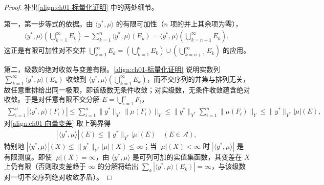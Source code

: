 \documentclass[../../main.tex]{subfiles}%
\begin{document}
\begin{proof}
补出\eqref{align:ch01-标量化证明} 中的两处细节。

第一，第一步等式的依据。由 $\langle y^*,\mu\rangle$ 的有限可加性（$n$ 项的并上其余项为零），
\begin{align*}
\langle y^*,\mu\rangle\left(\bigcup_{k=1}^\infty E_k\right)-\sum_{k=1}^n\langle y^*,\mu\rangle(E_k)
=\langle y^*,\mu\rangle\left(\bigcup_{k=n+1}^\infty E_k\right),
\end{align*}
这正是有限可加性对不交并 $\bigcup_{k=1}^\infty E_k=\left(\bigcup_{k=1}^n E_k\right)\cup\left(\bigcup_{k=n+1}^\infty E_k\right)$ 的应用。

第二，级数的绝对收敛与变差有限。\eqref{align:ch01-标量化证明} 说明实数列 $\sum_{k=1}^\infty\langle y^*,\mu\rangle(E_k)$ 收敛到 $\langle y^*,\mu\rangle\left(\bigcup_{k=1}^\infty E_k\right)$，而不交序列的并集与排列无关，故任意重排给出同一极限，即该级数无条件收敛；对实级数，无条件收敛蕴含绝对收敛。于是对任意有限不交分解 $E=\bigcup_{i=1}^n F_i$，
\begin{align*}
\sum_{i=1}^n\left|\langle y^*,\mu\rangle(F_i)\right|
\leqslant\sum_{i=1}^n\|y^*\|_{Y^*}\|\mu(F_i)\|_Y
\leqslant\|y^*\|_{Y^*}\sum_{i=1}^n\|\mu(F_i)\|_Y\leqslant\|y^*\|_{Y^*}|\mu|(E),
\end{align*}
对\eqref{align:ch01-向量变差} 取上确界得
\begin{align}
\left|\langle y^*,\mu\rangle\right|(E)\leqslant\|y^*\|_{Y^*}|\mu|(E)\quad(E\in\mathcal{A}), \label{align:ch01-标量化变差}
\end{align}
特别地 $\left|\langle y^*,\mu\rangle\right|(X)\leqslant\|y^*\|_{Y^*}|\mu|(X)\leqslant\infty$；当 $|\mu|(X)<\infty$ 时 $\left|\langle y^*,\mu\rangle\right|$ 是有限测度。即使 $|\mu|(X)=\infty$，由 $\langle y^*,\mu\rangle$ 是可列可加的实值集函数，其变差在 $X$ 上仍有限（否则取变差趋于 $\infty$ 的分解将给出 $\sum_k\left|\langle y^*,\mu\rangle(E_k)\right|=\infty$，与该级数对一切不交序列绝对收敛矛盾）。
\end{proof}
\end{document}
